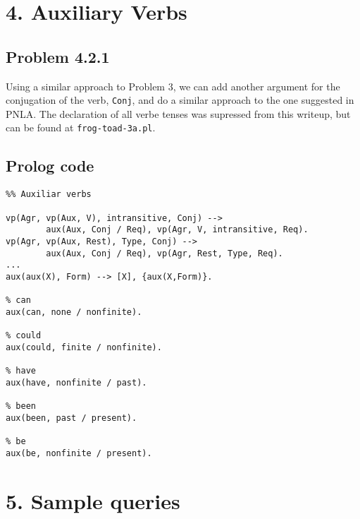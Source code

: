 \documentclass[12pt]{article}
\makeatletter
\newenvironment{problem x}{\@startsection
       {section}
       {1}
       {-.2em}
       {-3.5ex plus -1ex minus -.2ex}
       {2.3ex plus .2ex}
       {\pagebreak[3] %
       \large\bf\noindent{Problem }
       }
       }
       {%
       \begin{center}\large\bf \ldots\ldots\ldots\end{center}}
\makeatother
\begin{document}
  \newpage
  \section*{4. Auxiliary Verbs}
    \subsection*{Problem 4.2.1}

    Using a similar approach to Problem $3$, we can add another argument for the conjugation of the verb, \texttt{Conj}, and do a similar approach to the one suggested in PNLA. The declaration of all verbe tenses was supressed from this writeup, but can be found at \texttt{frog-toad-3a.pl}.

    \subsection*{Prolog code}
    \begin{verbatim}
%% Auxiliar verbs

vp(Agr, vp(Aux, V), intransitive, Conj) --> 
        aux(Aux, Conj / Req), vp(Agr, V, intransitive, Req).
vp(Agr, vp(Aux, Rest), Type, Conj) -->
        aux(Aux, Conj / Req), vp(Agr, Rest, Type, Req).
...
aux(aux(X), Form) --> [X], {aux(X,Form)}.

% can
aux(can, none / nonfinite).

% could
aux(could, finite / nonfinite).

% have
aux(have, nonfinite / past).

% been
aux(been, past / present).

% be
aux(be, nonfinite / present).
    \end{verbatim}

  \newpage
  \section*{5. Sample queries}
\end{document}
